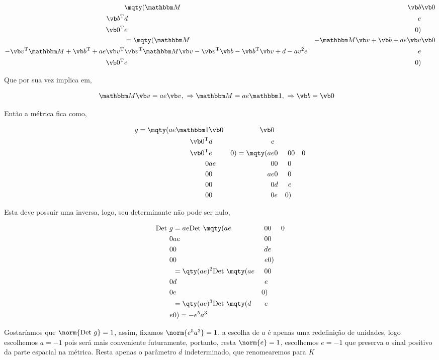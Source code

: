 \documentclass[twoside]{amsart}
\numberwithin{equation}{section}
\begin{document}
\begin{refsection}
\begin{align}
    &\mqty(\mathbbm M&\vb b&\vb 0\\\vb b^{\textup T}&d&e\\\vb 0^{\textup T}&e&0)\\
    &=\mqty(\mathbbm M&-\mathbbm M \vb v+\vb b+ae\vb v&\vb 0\\ -\vb v^{\textup T}\mathbbm M+\vb b^{\textup T}+ae\vb v^{\textup T}&\vb v^{\textup T}\mathbbm M\vb v-\vb v^{\textup T}\vb b-\vb b^{\textup T}\vb v+d-av^2e&e\\ \vb 0^{\textup T}&e&0)
\end{align}

Que por sua vez implica em,

\begin{align}
    \mathbbm M \vb v&= ae\vb v,\ \Rightarrow \mathbbm M=ae\mathbbm 1,\ \Rightarrow \vb b=\vb 0
\end{align}

Então a métrica fica como,

\begin{align}
    g=\mqty(ae\mathbbm 1&\vb 0&\vb 0\\\vb 0^{\textup T}&d&e\\\vb 0^{\textup T}&e&0 )=\mqty(ae &0&0&0&0\\0&ae&0&0&0\\0&0&ae&0&0\\0&0&0&d&e\\0&0&0&e&0)
\end{align}

Esta deve possuir uma inversa, logo, seu determinante não pode ser nulo,

\begin{align}
    \textup{Det }g&=ae\textup{Det }\mqty(ae&0&0&0\\0&ae&0&0\\0&0&d&e\\0&0&e&0)\\
    &=\qty(ae)^2\textup{Det }\mqty(ae&0&0\\0&d&e\\0&e&0)\\
    &=\qty(ae)^3\textup{Det }\mqty(d&e\\e&0)=-e^5a^3
\end{align}

Gostaríamos que $\norm{\textup{Det }g}=1$, assim, fixamos $\norm{e^5a^3}=1$, a escolha de $a$ é apenas uma redefinição de unidades, logo escolhemos $a=-1$ pois será mais conveniente futuramente, portanto, resta $\norm{e}=1$, escolhemos $e=-1$ que preserva o sinal positivo da parte espacial na métrica. Resta apenas o parâmetro $d$ indeterminado, que renomearemos para $K$


\end{refsection}
\end{document}
